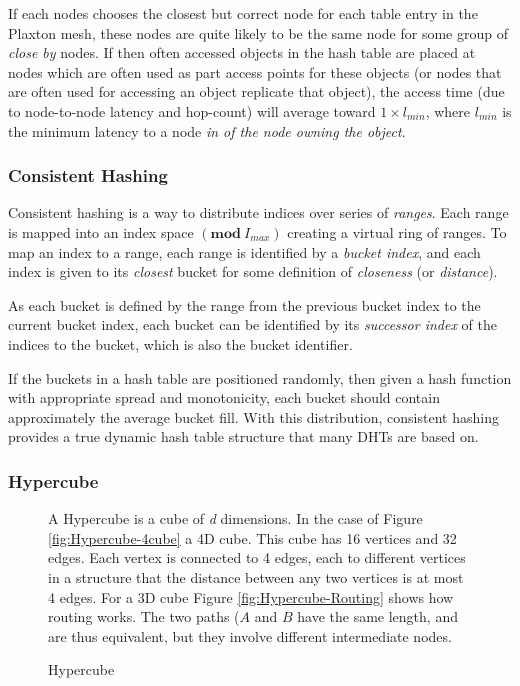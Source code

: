 If each nodes chooses the closest but correct node for each table entry in the Plaxton mesh,
 these nodes are quite likely to be the same node for some group of \emph{close by} nodes.
 If then often accessed objects in the hash table are placed at nodes which are
 often used as part access points for these objects (or nodes that are often used
 for accessing an object replicate that object), the access time (due to node-to-node latency and
 hop-count) will average toward $1\times l_{min}$, where $l_{min}$ is the minimum latency
 to a node \emph{in  of the node owning the object}.

\subsubsection{Consistent Hashing}
\label{theory:ConsistentHashing}

Consistent hashing\cite{karger-97-consistent-hashing} is a way to distribute
 indices over series of \emph{ranges}. Each range is mapped into an index
 space $(\mathbf{mod}\ I_{max})$ creating a virtual ring of ranges. To map an
 index to a range, each range is identified by a \emph{bucket index}, and
 each index is given to its \emph{closest} bucket for some definition of
 \emph{closeness} (or \emph{distance}).

As each bucket is defined by the range from the previous bucket index
 to the current bucket index, each bucket can be identified by its
 \emph{successor index} of the indices  to the bucket,
 which is also the bucket identifier.

If the buckets in a hash table are positioned randomly, then given a hash
 function with appropriate spread and monotonicity, each
 bucket should contain approximately the average bucket fill. With this
 distribution, consistent hashing provides a true dynamic hash table
 structure that many DHTs are based on.

\subsubsection{Hypercube}
\label{theory:Hypercube}

\begin{figure}[htp]
\centering
{}
\hspace{.1\linewidth}
\parbox{.9\linewidth}{\small
   A Hypercube is a cube of \emph{d} dimensions. In the case of Figure
   \ref{fig:Hypercube-4cube} a 4D cube. This cube has 16 vertices and
   32 edges. Each vertex is connected to 4 edges, each to different vertices
   in a structure that the distance between any two vertices is at most
   4 edges. For a 3D cube Figure \ref{fig:Hypercube-Routing} shows how
   routing works. The two paths ($A$ and $B$ have the same length, and are
   thus equivalent, but they involve different intermediate nodes. }
\caption{Hypercube}
\label{fig:Hypercube}
\end{figure}


